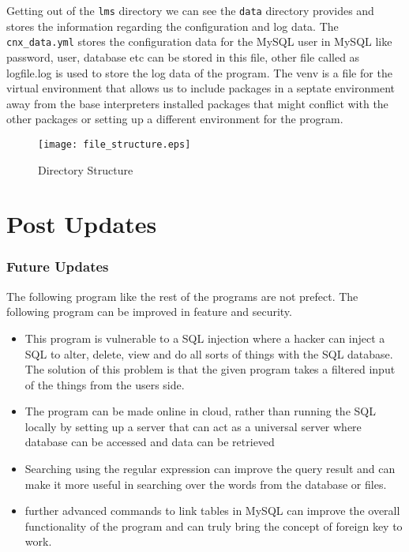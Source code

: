 \documentclass[12pt, a4paper, titlepage, openany]{report}
\begin{document}
Getting out of the \verb+lms+ directory we can see the \verb+data+ directory provides and stores the information regarding the configuration and log data. The \verb+cnx_data.yml+ stores the configuration data for the MySQL user in MySQL like password, user, database etc can be stored in this file, other file called as logfile.log is used to store the log data of the program.
The venv is a file for the virtual environment that allows us to include packages in a septate environment away from the base interpreters installed packages that might conflict with the other packages or setting up a different environment for the program. 
\par
\begin{figure}
\centering
\texttt{[image: file\_structure.eps]}
\caption{Directory Structure}
\label{file_struct}
\end{figure}

\newpage
\part{Post Updates}

\section{Future Updates}
The following program like the rest of the programs are not prefect. The following program can be improved in feature and security.
\begin{itemize} 
\item This program is vulnerable to a SQL injection where a hacker can inject a SQL to alter, delete, view and do all sorts of things with the SQL database. The solution of this problem is that the given program takes a filtered input of the things from the users side.
\item The program can be made online in cloud, rather than running the SQL locally by setting up a server that can act as a universal server where database can be accessed and data can be retrieved 
\item Searching using the regular expression can improve the query result and can make it more useful in searching over the words from the database or files.
\item further advanced commands to link tables in MySQL can improve the overall functionality of the program and can truly bring the concept of foreign key to work.

\end{itemize}
\end{document}
